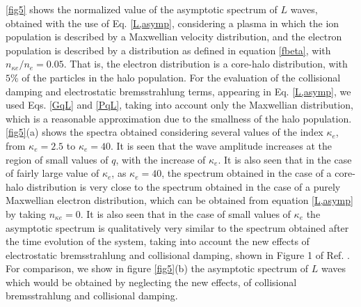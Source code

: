 \documentclass[12pt,a4paper,ruledheader]{report}
\begin{document}
\begin{appendix}
\autoref{fig5} shows the normalized value of the asymptotic spectrum of
$L$ waves, obtained with the use of Eq. \eqref{L,asymp}, considering a
plasma in which the ion population is described by a Maxwellian velocity
distribution, and the electron population is described by a distribution
as defined in equation \eqref{fbeta}, with $n_{\kappa e}/n_e= 0.05$. That
is, the electron distribution is a core-halo distribution, with $5\%$
of the particles in the halo population. For the evaluation of the
collisional damping and electrostatic bremsstrahlung terms, appearing
in Eq. \eqref{L,asymp}, we used Eqs. \eqref{GqL} and \eqref{PqL}, taking
into account only the Maxwellian distribution, which is a reasonable
approximation  due to the smallness of the halo population. 
\autoref{fig5}(a) shows the spectra obtained considering several values
of the index $\kappa_e$, from $\kappa_e=2.5$ to $\kappa_e=40$. It is seen
that the wave amplitude increases at the region of small values of $q$,
with the increase of $\kappa_e$. It is also seen that in the case of
fairly large value of $\kappa_e$, as $\kappa_e=40$, the spectrum obtained
in the case of a core-halo distribution is very close to the spectrum
obtained in the case of a purely Maxwellian electron distribution, which
can be obtained from equation \eqref{L,asymp} by taking $n_{\kappa e}=0$.
It is also seen that in the case of small values of $\kappa_e$ the
asymptotic spectrum is qualitatively very similar to the spectrum
obtained after the time evolution of the system, taking into account
the new effects of electrostatic bremsstrahlung and collisional damping,
shown in Figure 1 of Ref. \cite{Tigik2017a}. For comparison, we
show in figure \autoref{fig5}(b) the asymptotic spectrum of $L$ waves
which would be obtained by neglecting the new effects, of collisional
bremsstrahlung and collisional damping.


\end{appendix}
\end{document}
